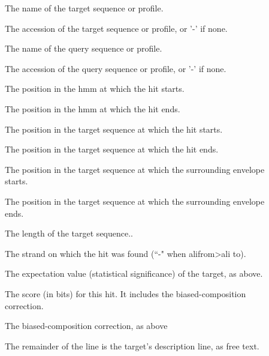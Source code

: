 \begin{description}
\item[]
  The name of the target sequence or profile. 

\item[]
  The accession of the target sequence or profile, or '-' if none.

\item[] 
  The name of the query sequence or profile.

\item[]
  The accession of the query sequence or profile, or '-' if none.

\item[]
  The position in the hmm at which the hit starts.

\item[]
  The position in the hmm at which the hit ends.

\item[]
  The position in the target sequence at which the hit starts.

\item[]
  The position in the target sequence at which the hit ends.

\item[]
  The position in the target sequence at which the surrounding envelope starts.

\item[]
  The position in the target sequence at which the surrounding envelope ends.

\item[]
  The length of the target sequence..

\item[]
  The strand on which the hit was found (``-" when alifrom>ali to). 
  
\item[] The expectation value
  (statistical significance) of the target, as above.

\item[] 
  The score (in bits) for this hit. It includes the biased-composition 
  correction. 

\item[] The biased-composition
  correction, as above

\item[] 
  The remainder of the line is the target's description line, as free text.
\end{description}


